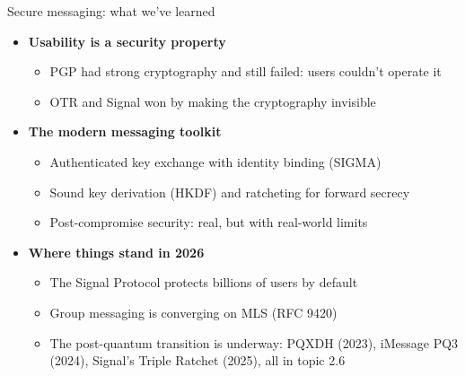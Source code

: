 \ifdefined\PRESENTATION\else\PassOptionsToClass{handout}{beamer}\fi\documentclass[aspectratio=169, lualatex]{beamer}
\begin{document}
\begin{frame}{Secure messaging: what we've learned}
	\begin{itemize}
		\item \textbf{Usability is a security property}
		      \begin{itemize}
			      \item PGP had strong cryptography and still failed: users couldn't operate it
			      \item OTR and Signal won by making the cryptography invisible
		      \end{itemize}
		\item \textbf{The modern messaging toolkit}
		      \begin{itemize}
			      \item Authenticated key exchange with identity binding (SIGMA)
			      \item Sound key derivation (HKDF) and ratcheting for forward secrecy
			      \item Post-compromise security: real, but with real-world limits
		      \end{itemize}
		\item \textbf{Where things stand in 2026}
		      \begin{itemize}
			      \item The Signal Protocol protects billions of users by default
			      \item Group messaging is converging on MLS (RFC 9420)
			      \item The post-quantum transition is underway: PQXDH (2023), iMessage PQ3 (2024), Signal's Triple Ratchet (2025), all in topic 2.6
		      \end{itemize}
	\end{itemize}
\end{frame}

\begin{frame}[plain]
	\titlepage
\end{frame}
\end{document}

